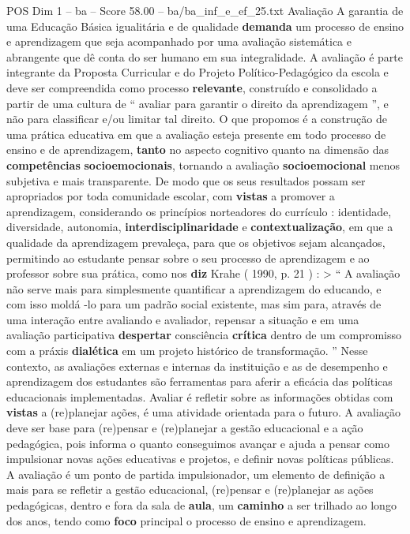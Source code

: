 \begin{textsample}{POS Dim 1 – ba – Score 58.00 – ba/ba\_inf\_e\_ef\_25.txt}  \label{ex:f1_pos_104}
Avaliação A garantia de uma Educação Básica igualitária e de qualidade \textbf{demanda} um processo de ensino e aprendizagem que seja acompanhado por uma avaliação sistemática e abrangente que dê conta do ser humano em sua integralidade.
A avaliação é parte integrante da Proposta Curricular e do Projeto Político-Pedagógico da escola e deve ser compreendida como processo \textbf{relevante}, construído e consolidado a partir de uma cultura de “ avaliar para garantir o direito da aprendizagem ”, e não para classificar e/ou limitar tal direito.
O que propomos é a construção de uma prática educativa em que a avaliação esteja presente em todo processo de ensino e de aprendizagem, \textbf{tanto} no aspecto cognitivo quanto na dimensão das \textbf{competências} \textbf{socioemocionais}, tornando a avaliação \textbf{socioemocional} menos subjetiva e mais transparente.
De modo que os seus resultados possam ser apropriados por toda comunidade escolar, com \textbf{vistas} a promover a aprendizagem, considerando os princípios norteadores do currículo : identidade, diversidade, autonomia, \textbf{interdisciplinaridade} e \textbf{contextualização}, em que a qualidade da aprendizagem prevaleça, para que os objetivos sejam alcançados, permitindo ao estudante pensar sobre o seu processo de aprendizagem e ao professor sobre sua prática, como nos \textbf{diz} Krahe ( 1990, p. 21 ) : > “ A avaliação não serve mais para simplesmente quantificar a aprendizagem do educando, e com isso moldá -lo para um padrão social existente, mas sim para, através de uma interação entre avaliando e avaliador, repensar a situação e em uma avaliação participativa \textbf{despertar} consciência \textbf{crítica} dentro de um compromisso com a práxis \textbf{dialética} em um projeto histórico de transformação. ” Nesse contexto, as avaliações externas e internas da instituição e as de desempenho e aprendizagem dos estudantes são ferramentas para aferir a eficácia das políticas educacionais implementadas.
Avaliar é refletir sobre as informações obtidas com \textbf{vistas} a (re)planejar ações, é uma atividade orientada para o futuro.
A avaliação deve ser base para (re)pensar e (re)planejar a gestão educacional e a ação pedagógica, pois informa o quanto conseguimos avançar e ajuda a pensar como impulsionar novas ações educativas e projetos, e definir novas políticas públicas.
A avaliação é um ponto de partida impulsionador, um elemento de definição a mais para se refletir a gestão educacional, (re)pensar e (re)planejar as ações pedagógicas, dentro e fora da sala de \textbf{aula}, um \textbf{caminho} a ser trilhado ao longo dos anos, tendo como \textbf{foco} principal o processo de ensino e aprendizagem.

\end{textsample}

